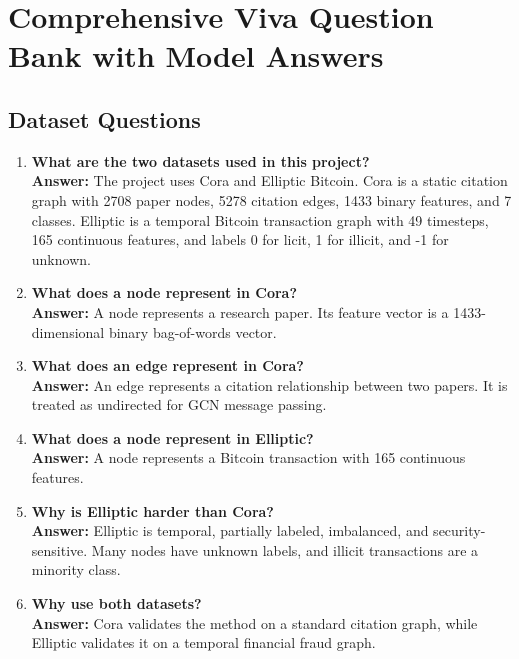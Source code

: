 \documentclass[12pt,a4paper]{article}
\begin{document}
\section{Comprehensive Viva Question Bank with Model Answers}

\subsection{Dataset Questions}
\begin{enumerate}[label=\textbf{Q\arabic*.}]
    \item \textbf{What are the two datasets used in this project?}\\
    \textbf{Answer:} The project uses Cora and Elliptic Bitcoin. Cora is a static citation graph with 2708 paper nodes, 5278 citation edges, 1433 binary features, and 7 classes. Elliptic is a temporal Bitcoin transaction graph with 49 timesteps, 165 continuous features, and labels 0 for licit, 1 for illicit, and -1 for unknown.

    \item \textbf{What does a node represent in Cora?}\\
    \textbf{Answer:} A node represents a research paper. Its feature vector is a 1433-dimensional binary bag-of-words vector.

    \item \textbf{What does an edge represent in Cora?}\\
    \textbf{Answer:} An edge represents a citation relationship between two papers. It is treated as undirected for GCN message passing.

    \item \textbf{What does a node represent in Elliptic?}\\
    \textbf{Answer:} A node represents a Bitcoin transaction with 165 continuous features.

    \item \textbf{Why is Elliptic harder than Cora?}\\
    \textbf{Answer:} Elliptic is temporal, partially labeled, imbalanced, and security-sensitive. Many nodes have unknown labels, and illicit transactions are a minority class.

    \item \textbf{Why use both datasets?}\\
    \textbf{Answer:} Cora validates the method on a standard citation graph, while Elliptic validates it on a temporal financial fraud graph.
\end{enumerate}
\end{document}
